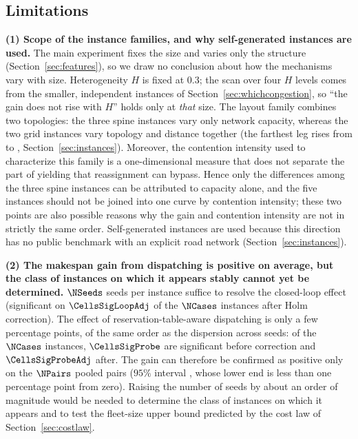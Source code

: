 \subsection{Limitations}
\label{sec:limitations}

\textbf{(1) Scope of the instance families, and why self-generated instances are used.}
The main experiment fixes the size and varies only the structure (Section~\ref{sec:features}), so we draw no conclusion about how the mechanisms vary with size. Heterogeneity $H$ is fixed at $0.3$; the scan over four $H$ levels comes from the smaller, independent instances of Section~\ref{sec:whichcongestion}, so ``the gain does not rise with $H$'' holds only at \emph{that} size.
The layout family combines two topologies: the three spine instances vary only network capacity, whereas the two grid instances vary topology and distance together (the farthest leg rises from \LegDumbbell{} to \LegGrid{}, Section~\ref{sec:instances}). Moreover, the contention intensity used to characterize this family is a one-dimensional measure that does not separate the part of yielding that reassignment can bypass.
Hence only the differences among the three spine instances can be attributed to capacity alone, and the five instances should not be joined into one curve by contention intensity; these two points are also possible reasons why the gain and contention intensity are not in strictly the same order.
Self-generated instances are used because this direction has no public benchmark with an explicit road network (Section~\ref{sec:instances}).

\textbf{(2) The makespan gain from dispatching is positive on average, but the class of instances on which it appears stably cannot yet be determined.}
$\NSeeds$ seeds per instance suffice to resolve the closed-loop effect (significant on $\CellsSigLoopAdj$ of the $\NCases$ instances after Holm correction). The effect of reservation-table-aware dispatching is only a few percentage points, of the same order as the dispersion across seeds: of the $\NCases$ instances, $\CellsSigProbe$ are significant before correction and $\CellsSigProbeAdj$ after.
The gain can therefore be confirmed as positive only on the $\NPairs$ pooled pairs ($95\%$ interval \CIProbeLoop{}, whose lower end is less than one percentage point from zero).
Raising the number of seeds by about an order of magnitude would be needed to determine the class of instances on which it appears and to test the fleet-size upper bound predicted by the cost law of Section~\ref{sec:costlaw}.

